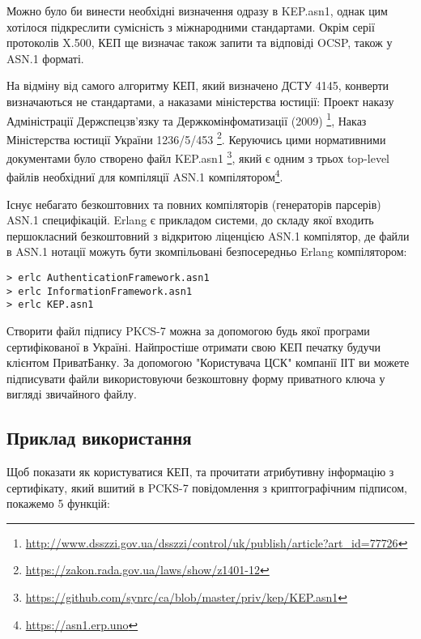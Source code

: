 Можно було би винести необхідні визначення одразу в KEP.asn1,
однак цим хотілося підкреслити сумісність з міжнародними стандартами. Окрім серії
протоколів X.500, КЕП ще визначає також запити та відповіді OCSP, також у ASN.1 форматі.

\newpage
На відміну від самого алгоритму КЕП, який визначено ДСТУ 4145,
конверти визначаються не стандартами, а наказами міністерства юстиції:
Проект наказу Адміністрації Держспецзв'язку та Держкомінфоматизації (2009) \footnote{\url{http://www.dsszzi.gov.ua/dsszzi/control/uk/publish/article?art\_id=77726}},
Наказ Міністерства юстиції України 1236/5/453 \footnote{\url{https://zakon.rada.gov.ua/laws/show/z1401-12}}.
Керуючись цими нормативними документами було створено файл KEP.asn1 \footnote{\url{https://github.com/synrc/ca/blob/master/priv/kep/KEP.asn1}},
який є одним з трьох top-level файлів необхідниї для компіляції ASN.1 компілятором\footnote{\url{https://asn1.erp.uno}}.

Існує небагато безкоштовних та повних компіляторів (генераторів парсерів)
ASN.1 специфікацій. Erlang є прикладом системи, до складу якої входить
першокласний безкоштовний з відкритою ліценцією ASN.1 компілятор, де
файли в ASN.1 нотації можуть бути зкомпільовані безпосередньо Erlang компілятором:

\renewcommand{\footnotesize}{\normal}

\begin{lstlisting}
> erlc AuthenticationFramework.asn1
> erlc InformationFramework.asn1
> erlc KEP.asn1
\end{lstlisting}

Створити файл підпису PKCS-7 можна за допомогою будь якої програми сертифікованої в Україні.
Найпростіше отримати свою КЕП печатку будучи клієнтом ПриватБанку. За допомогою
"Користувача ЦСК" компанії ІІТ ви можете підписувати файли використовуючи безкоштовну
форму приватного ключа у вигляді звичайного файлу.

\newpage
\subsection{Приклад використання}

Щоб показати як користуватися КЕП, та прочитати атрибутивну інформацію з сертифікату,
який вшитий в PCKS-7 повідомлення з криптографічним підписом, покажемо 5 функцій:

\renewcommand{\footnotesize}{\scriptsize}

